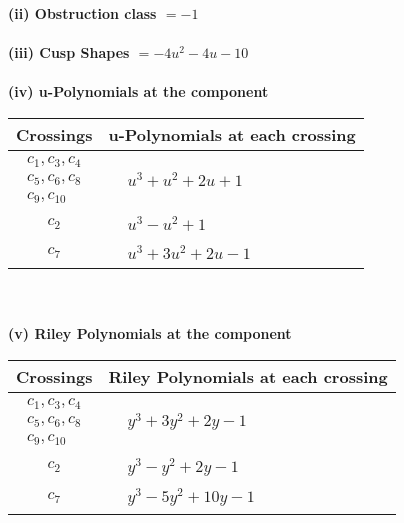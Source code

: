 \documentclass[1p]{elsarticle_modified}
\theoremstyle{definition}
\begin{document}
\flushleft \textbf{(ii) Obstruction class $= -1$}\\~\\
\flushleft \textbf{(iii) Cusp Shapes $= -4 u^2-4 u-10$}\\~\\
\newpage\renewcommand{\arraystretch}{1}
\flushleft \textbf{(iv) u-Polynomials at the component}\newline \\
\begin{tabular}{m{50pt}|m{274pt}}
Crossings & \hspace{64pt}u-Polynomials at each crossing \\
\hline $$\begin{aligned}c_{1},c_{3},c_{4}\\c_{5},c_{6},c_{8}\\c_{9},c_{10}\end{aligned}$$&$\begin{aligned}
&u^3+u^2+2 u+1
\end{aligned}$\\
\hline $$\begin{aligned}c_{2}\end{aligned}$$&$\begin{aligned}
&u^3- u^2+1
\end{aligned}$\\
\hline $$\begin{aligned}c_{7}\end{aligned}$$&$\begin{aligned}
&u^3+3 u^2+2 u-1
\end{aligned}$\\
\hline
\end{tabular}\\~\\
\newpage\renewcommand{\arraystretch}{1}
\flushleft \textbf{(v) Riley Polynomials at the component}\newline \\
\begin{tabular}{m{50pt}|m{274pt}}
Crossings & \hspace{64pt}Riley Polynomials at each crossing \\
\hline $$\begin{aligned}c_{1},c_{3},c_{4}\\c_{5},c_{6},c_{8}\\c_{9},c_{10}\end{aligned}$$&$\begin{aligned}
&y^3+3 y^2+2 y-1
\end{aligned}$\\
\hline $$\begin{aligned}c_{2}\end{aligned}$$&$\begin{aligned}
&y^3- y^2+2 y-1
\end{aligned}$\\
\hline $$\begin{aligned}c_{7}\end{aligned}$$&$\begin{aligned}
&y^3-5 y^2+10 y-1
\end{aligned}$\\
\hline
\end{tabular}\\~\\
\end{document}
